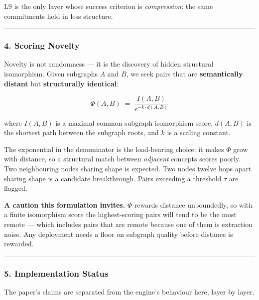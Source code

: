 \documentclass[
  11pt,
  a4paper,
]{article}
\begin{document}
L9 is the only layer whose success criterion is \emph{compression}: the
same commitments held in less structure.

\begin{center}\rule{0.5\linewidth}{0.5pt}\end{center}

\subsubsection{4. Scoring Novelty}\label{scoring-novelty}

Novelty is not randomness --- it is the discovery of hidden structural
isomorphism. Given subgraphs \(A\) and \(B\), we seek pairs that are
\textbf{semantically distant} but \textbf{structurally identical}:

\[
\Phi(A, B) \;=\; \frac{I(A, B)}{e^{-k \cdot d(A, B)}}
\]

where \(I(A,B)\) is a maximal common subgraph isomorphism score,
\(d(A,B)\) is the shortest path between the subgraph roots, and \(k\) is
a scaling constant.

The exponential in the denominator is the load-bearing choice: it makes
\(\Phi\) grow with distance, so a structural match between
\emph{adjacent} concepts scores poorly. Two neighbouring nodes sharing
shape is expected. Two nodes twelve hops apart sharing shape is a
candidate breakthrough. Pairs exceeding a threshold \(\tau\) are
flagged.

\textbf{A caution this formulation invites.} \(\Phi\) rewards distance
unboundedly, so with a finite isomorphism score the highest-scoring
pairs will tend to be the most remote --- which includes pairs that are
remote because one of them is extraction noise. Any deployment needs a
floor on subgraph quality before distance is rewarded.

\begin{center}\rule{0.5\linewidth}{0.5pt}\end{center}

\subsubsection{5. Implementation Status}\label{implementation-status}

The paper's claims are separated from the engine's behaviour here, layer
by layer.
\end{document}
